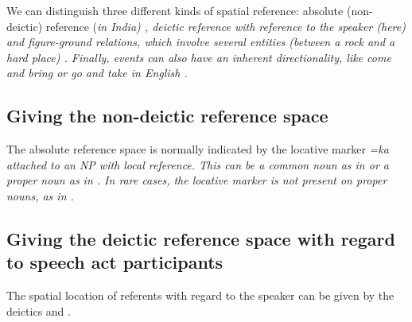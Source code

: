 We can distinguish three different kinds of spatial reference: absolute (non-deictic) reference (\em in India\em) , deictic reference with reference to the speaker (\em here\em)  and figure-ground relations, which involve several entities (\em between a rock and a hard place\em) . Finally, events can also have an inherent directionality, like \em come and bring \em or \em go and take \em in English .

\subsection[Non-deictic space]{Giving the non-deictic reference space}\label{sec:func:Givingthenon-deicticreferencespace}
The absolute reference space is normally indicated  by the locative marker \em =ka \em {} attached to an NP with local reference.  This can be a common noun as in  or a proper noun as in . In rare cases, the locative marker is not present on proper nouns, as in .









\subsection[Deictic space]{Giving the deictic reference space with regard to speech act participants}\label{sec:func:Givingthedeicticreferencespacewithregardtospeechactparticipants}
The spatial location of referents with regard to the speaker can be given by the deictics  and .




